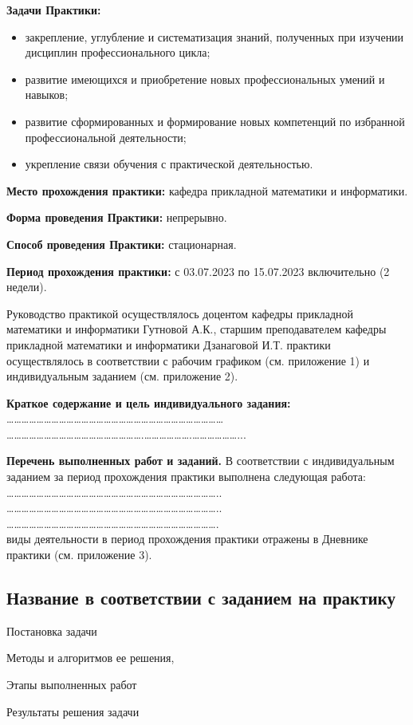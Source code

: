 \documentclass[a4paper,12pt]{article} %
\begin{document}
\textbf{Задачи Практики:} 
\begin{itemize}
    \item закрепление, углубление и систематизация знаний, полученных при изучении дисциплин профессионального цикла;
    \item развитие имеющихся и приобретение новых профессиональных умений и навыков; 
    \item развитие сформированных и формирование новых компетенций по избранной профессиональной деятельности;
    \item укрепление связи обучения с практической деятельностью.
\end{itemize}
\par \textbf{Место прохождения практики:} кафедра прикладной математики и информатики.
\par \textbf{Форма проведения Практики:} непрерывно.
\par \textbf{Способ проведения Практики:} стационарная.
\par \textbf{Период прохождения практики:} с 03.07.2023 по 15.07.2023 включительно (2 недели).
\par Руководство практикой осуществлялось доцентом кафедры прикладной математики и информатики Гутновой А.К., старшим преподавателем кафедры прикладной математики и информатики Дзанаговой И.Т. 
 практики осуществлялось в соответствии с рабочим графиком (см. приложение 1) и индивидуальным заданием (см. приложение 2).
\par \textbf{Краткое содержание и цель индивидуального задания:}\\
…………………………………………………………………………… ……………………………………………….……………….………………... \\
\par \textbf{Перечень выполненных работ и заданий.} В соответствии с индивидуальным заданием за период прохождения практики выполнена следующая работа: \\
………………………………………………………………………….. \\
………………………………………………………………………….. \\
…………………………………………………………………………. \\
 виды деятельности в период прохождения практики отражены в Дневнике практики (см. приложение 3). \\ 
\newpage
\setcounter{subsection}{0}
\setcounter{equation}{0}
\setcounter{section}{0}

\begin{center}
\section*{Название в соответствии с заданием на практику}
\end{center}
\par Постановка задачи 
\par Методы и алгоритмов ее решения,
\par Этапы выполненных работ 
\par Результаты решения задачи
\newpage
\setcounter{subsection}{0}
\setcounter{equation}{0}
\setcounter{section}{0}
\end{document}
